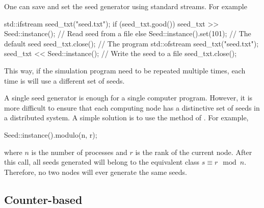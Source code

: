 \documentclass[11pt,bib,mint,hyper,altcolor]{marticle}
\begin{document}
One can save and set the seed generator using standard \cpp streams. For
example
\begin{cppcode}
  std::ifstream seed_txt("seed.txt");
  if (seed_txt.good())
      seed_txt >> Seed::instance(); // Read seed from a file
  else
      Seed::instance().set(101);    // The default seed
  seed_txt.close();
  // The program
  std::ofstream seed_txt("seed.txt");
  seed_txt << Seed::instance();     // Write the seed to a file
  seed_txt.close();
\end{cppcode}
This way, if the simulation program need to be repeated multiple times, each
time is will use a different set of seeds.

A single seed generator is enough for a single computer program. However, it is
more difficult to ensure that each computing node has a distinctive set of
seeds in a distributed system. A simple solution is to use the
 method of . For example,
\begin{cppcode}
  Seed::instance().modulo(n, r);
\end{cppcode}
where $n$ is the number of processes and $r$ is the rank of the current node.
After this call, all seeds generated will belong to the equivalent class
$s \equiv r\mod{n}$. Therefore, no two nodes will ever generate the
same seeds.

\subsection{Counter-based \protect\rng}
\label{sub:Coutner-based RNG}
\end{document}
